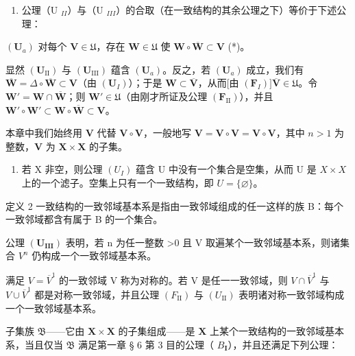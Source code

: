 \begin{enumerate}
\def\labelenumi{\arabic{enumi})}
\setcounter{enumi}{1}
\tightlist
\item
  公理（U \(_{II}\)）与（U \(_{III}\)）的合取（在一致结构的其余公理之下）等价于下述公理：
\end{enumerate}

\((\mathbf{U}_a)\) 对每个 \(\mathbf{V} \in \mathfrak{U}\)，存在 \(\mathbf{W} \in \mathfrak{U}\) 使 \(\mathbf{W} \circ \overline{\mathbf{W}} \subset \mathbf{V}\) (*)。

显然 \((\mathbf{U}_{\mathrm{II}})\) 与 \((\mathbf{U}_{\mathrm{III}})\) 蕴含 \((\mathbf{U}_a)\)。反之，若 \((\mathbf{U}_a)\) 成立，我们有 \(\overline{\mathbf{W}} = \Delta \circ \overline{\mathbf{W}} \subset \mathbf{V}\)（由 \((\mathbf{U}_I)\)）；于是 \(\mathbf{W} \subset \overline{\mathbf{V}}\)，从而{[}由 \((\mathbf{F}_I)] \overline{\mathbf{V}} \in \mathfrak{U}\)。令 \(\mathbf{W}' = \mathbf{W} \cap \overline{\mathbf{W}}\)；则 \(\mathbf{W}' \in \mathfrak{U}\)（由刚才所证及公理 \((\mathbf{F}_{\mathrm{II}})\)），并且 \(\mathbf{W}' \circ \mathbf{W}' \subset \mathbf{W} \circ \overline{\mathbf{W}} \subset \mathbf{V}\)。

本章中我们始终用 \(\mathbf{V}\) 代替 \(\mathbf{V} \circ \mathbf{V}\)，一般地写 \(\mathbf{V} = \mathbf{V} \circ \mathbf{V} = \mathbf{V} \circ \mathbf{V}\)，其中 \(n > 1\) 为整数，\(\mathbf{V}\) 为 \(\mathbf{X} \times \mathbf{X}\) 的子集。

\begin{enumerate}
\def\labelenumi{\arabic{enumi})}
\setcounter{enumi}{2}
\tightlist
\item
  若 X 非空，则公理 \((U_{I})\) 蕴含 U 中没有一个集合是空集，从而 U 是 \(X \times X\) 上的一个滤子。空集上只有一个一致结构，即 \(U = \{\varnothing\}\)。
\end{enumerate}

定义 2 一致结构的一致邻域基本系是指由一致邻域组成的任一这样的族 B：每个一致邻域都含有属于 B 的一个集合。

公理 \((\mathbf{U}_{\mathbf{III}})\) 表明，若 n 为任一整数 \textgreater0 且 V 取遍某个一致邻域基本系，则诸集合 \(V^{n}\) 仍构成一个一致邻域基本系。

满足 \(V = \overline{V}^{1}\) 的一致邻域 V 称为对称的。若 V 是任一一致邻域，则 \(V \cap \overline{V}^{1}\) 与 \(V \cup \overline{V}^{1}\) 都是对称一致邻域，并且公理 \((F_{\mathrm{II}})\) 与 \((U_{\mathrm{II}})\) 表明诸对称一致邻域构成一个一致邻域基本系。

子集族 \(\mathfrak{B}\)——它由 \(\mathbf{X} \times \mathbf{X}\) 的子集组成——是 \(\mathbf{X}\) 上某个一致结构的一致邻域基本系，当且仅当 \(\mathfrak{B}\) 满足第一章 § 6 第 3 目的公理（ \(B_{\mathbf{I}}\)），并且还满足下列公理：


